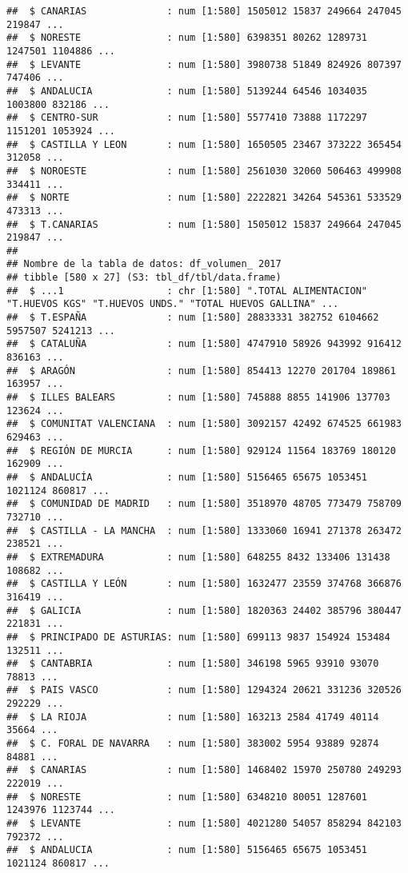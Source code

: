 \documentclass[
]{article}
\begin{document}
\begin{verbatim}
##  $ CANARIAS              : num [1:580] 1505012 15837 249664 247045 219847 ...
##  $ NORESTE               : num [1:580] 6398351 80262 1289731 1247501 1104886 ...
##  $ LEVANTE               : num [1:580] 3980738 51849 824926 807397 747406 ...
##  $ ANDALUCIA             : num [1:580] 5139244 64546 1034035 1003800 832186 ...
##  $ CENTRO-SUR            : num [1:580] 5577410 73888 1172297 1151201 1053924 ...
##  $ CASTILLA Y LEON       : num [1:580] 1650505 23467 373222 365454 312058 ...
##  $ NOROESTE              : num [1:580] 2561030 32060 506463 499908 334411 ...
##  $ NORTE                 : num [1:580] 2222821 34264 545361 533529 473313 ...
##  $ T.CANARIAS            : num [1:580] 1505012 15837 249664 247045 219847 ...
##  
## Nombre de la tabla de datos: df_volumen_ 2017 
## tibble [580 x 27] (S3: tbl_df/tbl/data.frame)
##  $ ...1                  : chr [1:580] ".TOTAL ALIMENTACION" "T.HUEVOS KGS" "T.HUEVOS UNDS." "TOTAL HUEVOS GALLINA" ...
##  $ T.ESPAÑA              : num [1:580] 28833331 382752 6104662 5957507 5241213 ...
##  $ CATALUÑA              : num [1:580] 4747910 58926 943992 916412 836163 ...
##  $ ARAGÓN                : num [1:580] 854413 12270 201704 189861 163957 ...
##  $ ILLES BALEARS         : num [1:580] 745888 8855 141906 137703 123624 ...
##  $ COMUNITAT VALENCIANA  : num [1:580] 3092157 42492 674525 661983 629463 ...
##  $ REGIÓN DE MURCIA      : num [1:580] 929124 11564 183769 180120 162909 ...
##  $ ANDALUCÍA             : num [1:580] 5156465 65675 1053451 1021124 860817 ...
##  $ COMUNIDAD DE MADRID   : num [1:580] 3518970 48705 773479 758709 732710 ...
##  $ CASTILLA - LA MANCHA  : num [1:580] 1333060 16941 271378 263472 238521 ...
##  $ EXTREMADURA           : num [1:580] 648255 8432 133406 131438 108682 ...
##  $ CASTILLA Y LEÓN       : num [1:580] 1632477 23559 374768 366876 316419 ...
##  $ GALICIA               : num [1:580] 1820363 24402 385796 380447 221831 ...
##  $ PRINCIPADO DE ASTURIAS: num [1:580] 699113 9837 154924 153484 132511 ...
##  $ CANTABRIA             : num [1:580] 346198 5965 93910 93070 78813 ...
##  $ PAIS VASCO            : num [1:580] 1294324 20621 331236 320526 292229 ...
##  $ LA RIOJA              : num [1:580] 163213 2584 41749 40114 35664 ...
##  $ C. FORAL DE NAVARRA   : num [1:580] 383002 5954 93889 92874 84881 ...
##  $ CANARIAS              : num [1:580] 1468402 15970 250780 249293 222019 ...
##  $ NORESTE               : num [1:580] 6348210 80051 1287601 1243976 1123744 ...
##  $ LEVANTE               : num [1:580] 4021280 54057 858294 842103 792372 ...
##  $ ANDALUCIA             : num [1:580] 5156465 65675 1053451 1021124 860817 ...

\end{verbatim}
\end{document}
